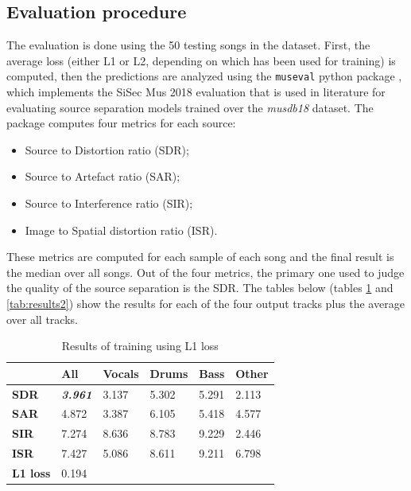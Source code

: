 \documentclass[12pt]{article}
\begin{document}
\subsection{Evaluation procedure}
The evaluation is done using the 50 testing songs in the dataset. First, the average loss (either L1 or L2, depending on which has been used for training) is computed, then the predictions are analyzed using the \texttt{museval} python package \cite{fabian_robert_stoter_2021_4486535}, which implements the SiSec Mus 2018 \cite{SiSEC18} evaluation that is used in literature for evaluating source separation models trained over the \textit{musdb18} dataset. The package computes four metrics for each source:
\begin{itemize}
\item Source to Distortion ratio (SDR);
\item Source to Artefact ratio (SAR);
\item Source to Interference ratio (SIR);
\item Image to Spatial distortion ratio (ISR).
\end{itemize}
These metrics are computed for each sample of each song and the final result is the median over all songs. Out of the four metrics, the primary one used to judge the quality of the source separation is the SDR. The tables below (tables \ref{tab:results1} and \ref{tab:results2}) show the results for each of the four output tracks plus the average over all tracks.


\begin{table}[h]
\centering
\begin{tabular}{l|l|llll}
                 & \textbf{All}            & \multicolumn{1}{l|}{\textbf{Vocals}} & \multicolumn{1}{l|}{\textbf{Drums}} & \multicolumn{1}{l|}{\textbf{Bass}} & \textbf{Other} \\ \hline
\textbf{SDR}     & \textit{\textbf{3.961}} & \multicolumn{1}{l|}{3.137}           & \multicolumn{1}{l|}{5.302}          & \multicolumn{1}{l|}{5.291}         & 2.113          \\ \hline
\textbf{SAR}     & 4.872                   & \multicolumn{1}{l|}{3.387}           & \multicolumn{1}{l|}{6.105}          & \multicolumn{1}{l|}{5.418}         & 4.577          \\ \hline
\textbf{SIR}     & 7.274                   & \multicolumn{1}{l|}{8.636}           & \multicolumn{1}{l|}{8.783}          & \multicolumn{1}{l|}{9.229}         & 2.446          \\ \hline
\textbf{ISR}     & 7.427                   & \multicolumn{1}{l|}{5.086}           & \multicolumn{1}{l|}{8.611}          & \multicolumn{1}{l|}{9.211}         & 6.798          \\ \hline
\textbf{L1 loss} & 0.194                   &                                      &                                     &                                    &               
\end{tabular}
\caption{Results of training using L1 loss}
\label{tab:results1}
\end{table}
\end{document}

